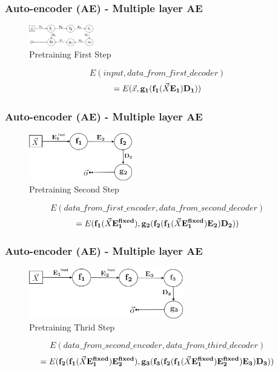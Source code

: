 \documentclass{beamer}
\begin{document}
\begin{frame}
\frametitle{Auto-encoder (AE) - Multiple layer AE}
\begin{figure}[t!]
    \centering
    \includegraphics[width=0.25\textwidth]{../paper/pictures/figures/train_MAE1.png}
    \caption{Pretraining First Step}
    \label{fig:train_MAE1}
\end{figure}

$$E(input, data\_from\_first\_decoder)$$
$$=E(\vec{x}, \bold{g_1}(\bold{f_1}(\vec{X}\bold{E_1})\bold{D_1}))$$
\end{frame}

\begin{frame}
\frametitle{Auto-encoder (AE) - Multiple layer AE}
\begin{figure}[t!]
    \centering
    \includegraphics[width=0.4\textwidth]{../paper/pictures/figures/train_MAE2.png}
    \caption{Pretraining Second Step}
    \label{fig:train_MAE2}
\end{figure}

$$E(data\_from\_first\_encoder, data\_from\_second\_decoder)$$
$$=E(\bold{f_1}(\vec{X}\bold{E_1^{fixed}}), \bold{g_2}(\bold{f_2}(\bold{f_1}(\vec{X}\bold{E_1^{fixed}})\bold{E_2})\bold{D_2}))$$
\end{frame}

\begin{frame}
\frametitle{Auto-encoder (AE) - Multiple layer AE}
\begin{figure}[t!]
    \centering
    \includegraphics[width=0.6\textwidth]{../paper/pictures/figures/train_MAE3.png}
    \caption{Pretraining Thrid Step}
    \label{fig:train_MAE3}
\end{figure}

$$E(data\_from\_second\_encoder, data\_from\_third\_decoder)$$
$$=E(\bold{f_2}(\bold{f_1}(\vec{X}\bold{E_1^{fixed}})\bold{E_2^{fixed}}), \bold{g_3}(\bold{f_3}(\bold{f_2}(\bold{f_1}(\vec{X}\bold{E_1^{fixed}})\bold{E_2^{fixed}})\bold{E_3})\bold{D_3}))$$
\end{frame}
\end{document}
